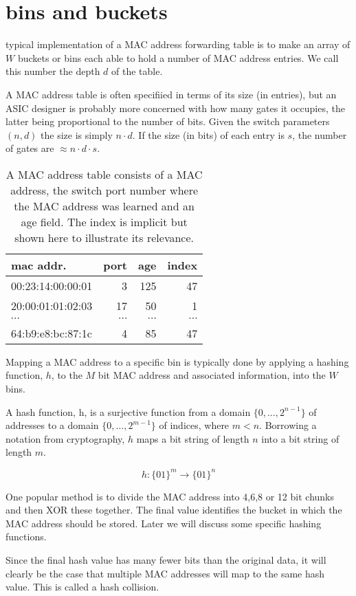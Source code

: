 \section{bins and buckets}
typical implementation of a MAC address forwarding table is 
to make an array of $W$ buckets or bins each able to hold a number
of MAC address entries. We call this number the depth $d$ of the table.

A MAC address table is often specifiied in terms of its size (in entries), but an ASIC designer is probably more concerned with 
how many gates it occupies, the latter being proportional to the number of bits. Given the switch parameters $(n,d)$ the size 
is simply $n\cdot d$. If the size (in bits) of each entry is $s$, the  number of gates are $\approx n\cdot d \cdot s$.



\begin{table}[!t]
\renewcommand{\arraystretch}{1.3}
\caption{ A MAC address table consists of a MAC address, the switch port number where the MAC address was learned
and an age field. The index is implicit but shown here to illustrate its relevance.}
\centering
\begin{tabular}{lrrr}
\hline
\bfseries mac addr. & \bfseries port & \bfseries age & \bfseries index\\ 
\hline
00:23:14:00:00:01 &  3 & 125  & 47 \\
20:00:01:01:02:03 &  17  &  50 & 1 \\
$\cdots$ & $\cdots$ & $\cdots$ & $\cdots$ \\
64:b9:e8:bc:87:1c &  4 & 85   & 47 \\
\hline
\end{tabular}

\end{table}




Mapping a MAC address to a specific bin is typically done by applying a hashing 
function, $h$,  to the $M$ bit MAC address and associated information,  into the $W$ bins.


A hash function, h,  is a surjective function from a domain $\{0,\ldots,2^{n -1}\}$ of addresses to a domain $\{0,\ldots,2^{ m-1}\}$ of indices, 
where $m < n$. Borrowing a notation from cryptography, $h$ maps a bit string of length $n$ into a bit string of length $m$.

$$
   h: \{01\}^m \rightarrow \{01\}^{n}
$$

One popular method is to divide the MAC address into 4,6,8 or 12 bit chunks and then 
XOR these together. The final value identifies the bucket in which
the MAC address should be stored. Later we will discuss some specific hashing functions.

Since the final hash value has many fewer bits than the original data, it will clearly be the case
that multiple MAC addresses will map to the same hash value. This is called a hash collision.


